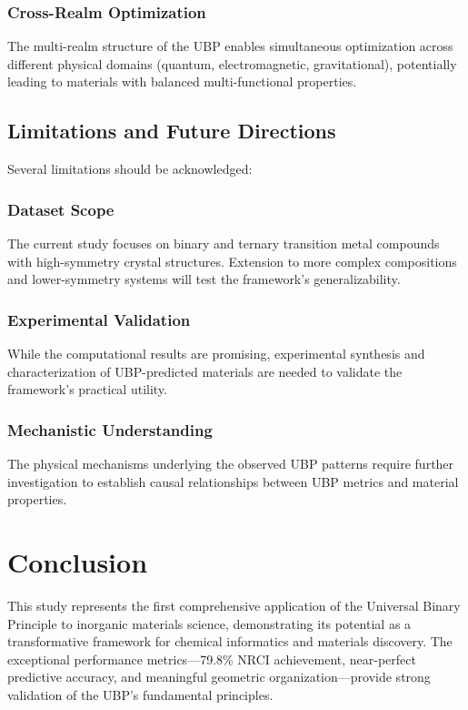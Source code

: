 \documentclass[12pt,a4paper]{article}
\begin{document}
\subsubsection{Cross-Realm Optimization}
The multi-realm structure of the UBP enables simultaneous optimization across different physical domains (quantum, electromagnetic, gravitational), potentially leading to materials with balanced multi-functional properties.

\subsection{Limitations and Future Directions}

Several limitations should be acknowledged:

\subsubsection{Dataset Scope}
The current study focuses on binary and ternary transition metal compounds with high-symmetry crystal structures. Extension to more complex compositions and lower-symmetry systems will test the framework's generalizability.

\subsubsection{Experimental Validation}
While the computational results are promising, experimental synthesis and characterization of UBP-predicted materials are needed to validate the framework's practical utility.

\subsubsection{Mechanistic Understanding}
The physical mechanisms underlying the observed UBP patterns require further investigation to establish causal relationships between UBP metrics and material properties.

\section{Conclusion}

This study represents the first comprehensive application of the Universal Binary Principle to inorganic materials science, demonstrating its potential as a transformative framework for chemical informatics and materials discovery. The exceptional performance metrics—79.8\% NRCI achievement, near-perfect predictive accuracy, and meaningful geometric organization—provide strong validation of the UBP's fundamental principles.
\end{document}
